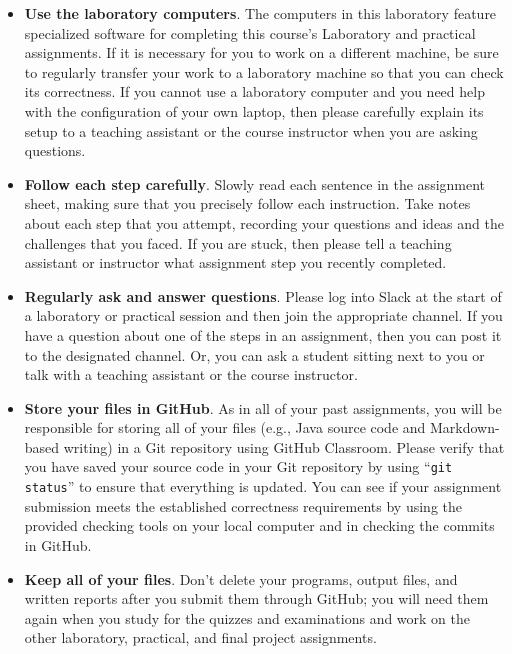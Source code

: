 \documentclass[11pt]{article}
\newcommand{\command}[1]{``\lstinline{#1}''}
\begin{document}
\begin{itemize}
  \setlength{\itemsep}{0pt}

\item {\bf Use the laboratory computers}. The computers in this laboratory
  feature specialized software for completing this course's Laboratory and
  practical assignments. If it is necessary for you to work on a different
  machine, be sure to regularly transfer your work to a laboratory machine so
  that you can check its correctness. If you cannot use a laboratory computer
  and you need help with the configuration of your own laptop, then please
  carefully explain its setup to a teaching assistant or the course instructor
  when you are asking questions.

\item {\bf Follow each step carefully}. Slowly read each sentence in the
  assignment sheet, making sure that you precisely follow each instruction. Take
  notes about each step that you attempt, recording your questions and ideas and
  the challenges that you faced. If you are stuck, then please tell a teaching
  assistant or instructor what assignment step you recently completed.

\item {\bf Regularly ask and answer questions}. Please log into Slack at the
  start of a laboratory or practical session and then join the appropriate
  channel. If you have a question about one of the steps in an assignment, then
  you can post it to the designated channel. Or, you can ask a student sitting
  next to you or talk with a teaching assistant or the course instructor.

\item {\bf Store your files in GitHub}. As in all of your past assignments, you
  will be responsible for storing all of your files (e.g., Java source code and
  Markdown-based writing) in a Git repository using GitHub Classroom. Please
  verify that you have saved your source code in your Git repository by using
  \command{git status} to ensure that everything is updated. You can see if your
  assignment submission meets the established correctness requirements by using
  the provided checking tools on your local computer and in checking the commits
  in GitHub.

\item {\bf Keep all of your files}. Don't delete your programs, output files,
  and written reports after you submit them through GitHub; you will need them
  again when you study for the quizzes and examinations and work on the other
  laboratory, practical, and final project assignments.


\end{itemize}
\end{document}
